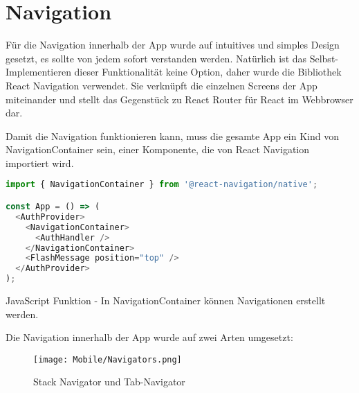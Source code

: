 \chapter{Navigation}
Für die Navigation innerhalb der App wurde auf intuitives und simples Design gesetzt, es sollte von
jedem sofort verstanden werden. Natürlich ist das Selbst-Implementieren dieser Funktionalität keine
Option, daher wurde die Bibliothek React Navigation verwendet. Sie verknüpft die einzelnen Screens
der App miteinander und stellt das Gegenstück zu React Router für React im Webbrowser dar.

Damit die Navigation funktionieren kann, muss die gesamte App ein Kind von NavigationContainer sein,
einer Komponente, die von React Navigation importiert wird.

\begin{code}[htp]
\begin{lstlisting}[firstnumber=1,language=JavaScript, style=JSX]
import { NavigationContainer } from '@react-navigation/native';

const App = () => (
  <AuthProvider>
    <NavigationContainer>
      <AuthHandler />
    </NavigationContainer>
    <FlashMessage position="top" />
  </AuthProvider>
);
\end{lstlisting}
\caption{JavaScript Funktion - In NavigationContainer können Navigationen erstellt werden.}
\end{code}

Die Navigation innerhalb der App wurde auf zwei Arten umgesetzt:

\begin{figure}[H]
  \begin{center}
    \texttt{[image: Mobile/Navigators.png]}
    \caption{Stack Navigator und Tab-Navigator}
  \end{center}
\end{figure}

\newpage


\newpage

